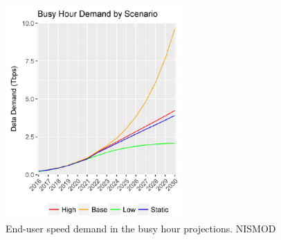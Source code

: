 \begin{figure}[H]
	\begin{Center}
		\includegraphics[width=0.60\textwidth]{./media/image21.png}
		\caption{End-user speed demand in the busy hour projections. NISMOD\cite{3-07}}
	\end{Center}
\end{figure}



